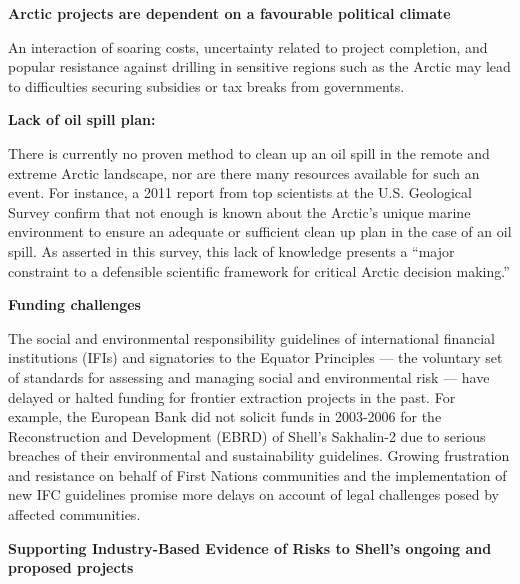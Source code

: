 \textbf{Arctic projects are dependent on a favourable political climate}



An interaction of soaring costs, uncertainty related to project completion, and popular resistance against drilling in sensitive regions such as the Arctic may lead to difficulties securing subsidies or tax breaks from governments.



\textbf{Lack of oil spill plan:}



There is currently no proven method to clean up an oil spill in the remote and extreme Arctic landscape, nor are there many resources available for such an event. 
For instance, a 2011 report from top scientists at the U.S. Geological Survey confirm that not enough is known about the Arctic’s unique marine environment to ensure an adequate or sufficient clean up plan in the case of an oil spill. 
As asserted in this survey, this lack of knowledge presents a ``major constraint to a defensible scientific framework for critical Arctic decision making.''



\textbf{Funding challenges}



The social and environmental responsibility guidelines of international financial institutions (IFIs) and signatories to the Equator Principles --- the voluntary set of standards for assessing and managing social and environmental risk --- have delayed or halted funding for frontier extraction projects in the past. 
For example, the European Bank did not solicit funds in 2003-2006 for the Reconstruction and Development (EBRD) of Shell’s Sakhalin-2 due to serious breaches of their environmental and sustainability guidelines. 
Growing frustration and resistance on behalf of First Nations communities and the implementation of new IFC guidelines promise more delays on account of legal challenges posed by affected communities. 



\textbf{Supporting Industry-Based Evidence of Risks to Shell’s ongoing and proposed projects}



